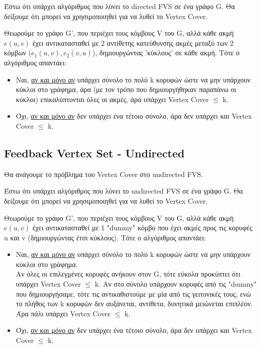 \documentclass[a4paper,11pt]{article}
\begin{document}
Έστω ότι υπάρχει αλγόριθμος που λύνει το directed FVS σε ένα γράφο G.
Θα δείξουμε ότι μπορεί να χρησιμοποιηθεί για να λυθεί το Vertex Cover.

Θεωρούμε το γράφο G', που περιέχει τους κόμβους V του G, αλλά κάθε ακμή
$e(u,v)$ έχει αντικατασταθεί με 2 αντίθετης κατεύθυνσης ακμές μεταξύ των 2
κόμβων ($e_1(u,v), e_2(v,u)$), δημιουργώντας 'κύκλους' σε κάθε ακμή.
Τότε ο αλγόριθμος απαντάει:
\begin{itemize}
\item Ναι, \underline{αν και μόνο αν} υπάρχει σύνολο το πολύ k κορυφών ώστε να
μην υπάρχουν κύκλοι στο γράφημα, άρα (με τον τρόπο που δημιουργήθηκαν παραπάνω
οι κύκλοι) επικαλύπτονται όλες οι ακμές, άρα υπάρχει Vertex Cover $\leq$ k.
\item Όχι, \underline{αν και μόνο αν} δεν υπάρχει ένα τέτοιο σύνολο, άρα δεν
υπάρχει και Vertex Cover $\leq$ k.
\end{itemize}

\subsection{Feedback Vertex Set - Undirected}
Θα ανάγουμε το πρόβλημα του Vertex Cover στο undirected FVS.

Έστω ότι υπάρχει αλγόριθμος που λύνει το undirected FVS σε ένα γράφο G.
Θα δείξουμε ότι μπορεί να χρησιμοποιηθεί για να λυθεί το Vertex Cover.

Θεωρούμε το γράφο G', που περιέχει τους κόμβους V του G, αλλά κάθε ακμή
$e(u,v)$ έχει αντικατασταθεί με 1 "dummy" κόμβο που έχει ακμές προς τις
κορυφές u και v (δημιουργώντας έτσι κύκλους).
Τότε ο αλγόριθμος απαντάει:
\begin{itemize}
\item Ναι, \underline{αν και μόνο αν} υπάρχει σύνολο το πολύ k κορυφών ώστε να
μην υπάρχουν κύκλοι στο γράφημα.\\ Αν όλες οι επιλεγμένες κορυφές ανήκουν στον
G, τότε εύκολα προκύπτει ότι υπάρχει Vertex Cover $\leq$ k. Αν στο σύνολο
υπάρχουν κορυφές από τις "dummy" που δημιουργήσαμε, τότε τις αντικαθιστούμε με
μία από τις γειτονικές τους, ενώ το πλήθος των k κορυφών δεν αυξάνεται,
αντίθετα, δυνητικά μειώνεται επιπλέον. Άρα πάλι υπάρχει Vertex Cover $\leq$ k.
\item Όχι, \underline{αν και μόνο αν} δεν υπάρχει ένα τέτοιο σύνολο, άρα δεν
υπάρχει και Vertex Cover $\leq$ k.
\end{itemize}

\end{document}
